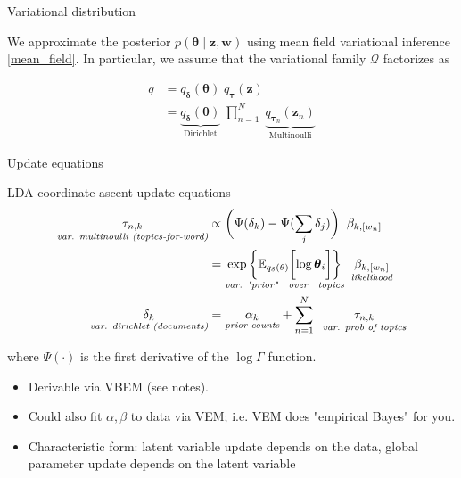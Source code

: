 \documentclass[10pt]{beamer}
\newcommand{\ds}{\displaystyle}
\newcommand{\+}[1]{\ensuremath{{\boldsymbol #1}}} %
\newcommand{\cond}{\; | \;}
\newcommand{\E}{\mathbb{E}}
\newcommand{\biggE}[2]{\E_{{#1}} \bigg[ {{#2}} \bigg]}
\newcommand{\Q}{\mathcal{Q}}
\newcommand{\explainterm}[2]{\underset{\textit{#1}}{#2}}
\newcommand{\explaintermbrace}[2]{\underbrace{#2}_{\text{#1}}}
\begin{document}

\begin{frame}{Variational distribution}

We approximate the posterior $p(\+\theta \cond \+z, \+w)$
using mean field variational inference  \eqref{mean_field}. In particular, we assume that the variational family $\Q$ factorizes as

\begin{align} 
q &= q_\+\delta (\+\theta) \; q_\+\tau (\+z) \nonumber \\
&=  \explaintermbrace{Dirichlet}{q_\+\delta (\+\theta)}  \; \ds\prod_{n=1}^N \; \explaintermbrace{Multinoulli}{q_{\+\tau_n} (\+z_n)} \label{mean_field_lda}
\end{align}

\end{frame}


\begin{frame}{Update equations} 

\begin{block}{LDA coordinate ascent update equations}
\begin{align} 
\explainterm{var. multinoulli (topics-for-word)}{\tau_{n,k}} &\propto  \bigg( \Psi(\delta_k) - \Psi (\ds\sum_j \delta_j) \bigg) \;\;  \beta_{k, [w_n]} 
 \label{multinomial_update} \\
 &=  \explainterm{var. "prior" \; over \; topics}{\exp \bigg\{ \biggE{q_\delta(\theta)}{\log \+\theta_i} \bigg\} } \;\; \explainterm{likelihood}{\beta_{k, [w_n]}}  \nonumber \\
\explainterm{var. dirichlet (documents)}{\delta_k} &= \explainterm{prior counts}{\alpha_k} + \ds\sum_{n=1}^N \;\; \explainterm{var. prob of topics}{\tau_{n,k}} \label{dirichlet_update}
\end{align}

where $\Psi(\cdot)$ is the first derivative of the $\log \Gamma$ function. 
\end{block}


\begin{itemize}
\item Derivable via VBEM (see notes). 
\item Could also fit $\alpha, \beta$ to data via VEM; i.e. VEM does "empirical Bayes" for you.  
\item Characteristic form: latent variable update depends on the data, global parameter update depends on the latent variable

\end{itemize}

 
\end{frame}
\end{document}
